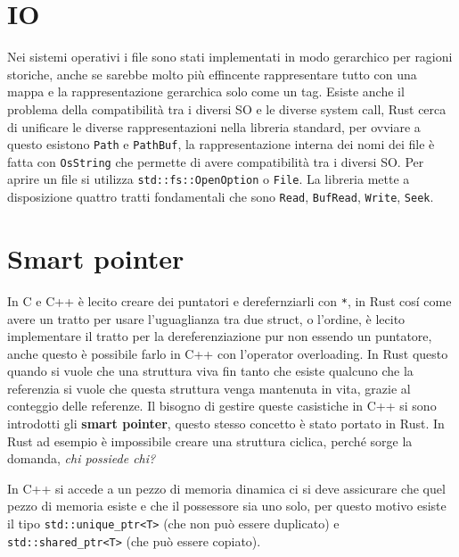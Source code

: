 \documentclass[12pt]{article}
\begin{document}
\section{IO}
Nei sistemi operativi i file sono stati implementati in modo gerarchico per ragioni storiche, anche se sarebbe molto pi\`u effincente rappresentare tutto con una mappa e la rappresentazione gerarchica solo come un tag. Esiste anche il problema della compatibilit\`a tra i diversi SO e le diverse system call, Rust cerca di unificare le diverse rappresentazioni nella libreria standard, per ovviare a questo esistono \texttt{Path} e \texttt{PathBuf}, la rappresentazione interna dei nomi dei file \`e fatta con \texttt{OsString} che permette di avere compatibilit\`a tra i diversi SO. Per aprire un file si utilizza \texttt{std::fs::OpenOption} o \texttt{File}. La libreria mette a disposizione quattro tratti fondamentali che sono \texttt{Read}, \texttt{BufRead}, \texttt{Write}, \texttt{Seek}.


\section{Smart pointer}
In C e C++ \`e lecito creare dei puntatori e derefernziarli con \texttt{*}, in Rust cos\'i come avere un tratto per usare l'uguaglianza tra due struct, o l'ordine, \`e lecito implementare il tratto per la dereferenziazione pur non essendo un puntatore, anche questo \`e possibile farlo in C++ con l'operator overloading. In Rust questo quando si vuole che una struttura viva fin tanto che esiste qualcuno che la referenzia si vuole che questa struttura venga mantenuta in vita, grazie al conteggio delle referenze. Il bisogno di gestire queste casistiche in C++ si sono introdotti gli \textbf{smart pointer}, questo stesso concetto \`e stato portato in Rust. In Rust ad esempio \`e impossibile creare una struttura ciclica, perch\'e sorge la domanda, \emph{chi possiede chi?}

In C++ si accede a un pezzo di memoria dinamica ci si deve assicurare che quel pezzo di memoria esiste e che il possessore sia uno solo, per questo motivo esiste il tipo \texttt{std::unique\_ptr<T>} (che non pu\`o essere duplicato) e \texttt{std::shared\_ptr<T>} (che pu\`o essere copiato).
\end{document}
